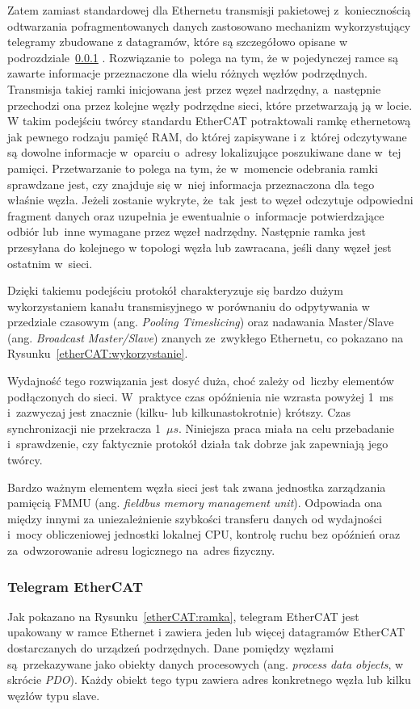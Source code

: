 Zatem zamiast standardowej dla Ethernetu transmisji pakietowej z~koniecznością odtwarzania pofragmentowanych danych zastosowano mechanizm wykorzystujący telegramy zbudowane z datagramów, które są szczegółowo opisane w podrozdziale~\ref{subsec:telegram} .
Rozwiązanie to~polega na tym, że w pojedynczej ramce są zawarte informacje przeznaczone dla wielu różnych węzłów podrzędnych. Transmisja takiej ramki inicjowana jest przez węzeł nadrzędny, a~następnie przechodzi ona przez kolejne węzły podrzędne sieci, które przetwarzają ją w locie. W takim podejściu twórcy standardu EtherCAT potraktowali ramkę ethernetową jak pewnego rodzaju pamięć RAM, do której zapisywane i z~której odczytywane są dowolne informacje w~oparciu o~adresy lokalizujące poszukiwane dane w~tej pamięci.
Przetwarzanie to polega na tym, że w~momencie odebrania ramki sprawdzane jest, czy znajduje się w~niej informacja przeznaczona dla tego właśnie węzła. Jeżeli zostanie wykryte, że~tak~jest to węzeł odczytuje odpowiedni fragment danych oraz uzupełnia je ewentualnie o~informacje potwierdzające odbiór lub~inne wymagane przez węzeł nadrzędny. Następnie ramka jest przesyłana do kolejnego w topologi węzła lub zawracana, jeśli dany węzeł jest ostatnim w~sieci. 

Dzięki takiemu podejściu protokół charakteryzuje się bardzo dużym wykorzystaniem kanału transmisyjnego w porównaniu do odpytywania w przedziale czasowym (ang. \textit{Pooling Timeslicing}) oraz nadawania Master/Slave (ang. \textit{Broadcast Master/Slave}) znanych ze~zwykłego Ethernetu, co pokazano na Rysunku~\ref{etherCAT:wykorzystanie}.

\vspace{-3mm}

Wydajność tego rozwiązania jest dosyć duża, choć zależy od~liczby elementów podłączonych do sieci. W~praktyce czas opóźnienia nie wzrasta powyżej 1~ms i~zazwyczaj jest znacznie (kilku- lub kilkunastokrotnie) krótszy. Czas synchronizacji nie przekracza 1~$\mu s$. Niniejsza praca miała na celu przebadanie i~sprawdzenie, czy faktycznie protokół działa tak dobrze jak zapewniają jego twórcy.

Bardzo ważnym elementem węzła sieci jest tak zwana jednostka zarządzania pamięcią FMMU (ang. \textit{fieldbus memory management unit}). Odpowiada ona między innymi za uniezależnienie szybkości transferu danych od wydajności i~mocy obliczeniowej jednostki lokalnej CPU, kontrolę ruchu bez opóźnień oraz za~odwzorowanie adresu logicznego na~adres fizyczny.

\subsubsection{Telegram EtherCAT}
\label{subsec:telegram}
Jak pokazano na Rysunku~\ref{etherCAT:ramka}, telegram EtherCAT jest upakowany w  ramce Ethernet i  zawiera jeden lub więcej datagramów EtherCAT dostarczanych do urządzeń podrzędnych. Dane pomiędzy węzłami są~przekazywane jako obiekty danych procesowych (ang. \textit{process data objects}, w skrócie \textit{PDO}). Każdy obiekt tego typu zawiera adres konkretnego węzła lub kilku węzłów typu slave.

